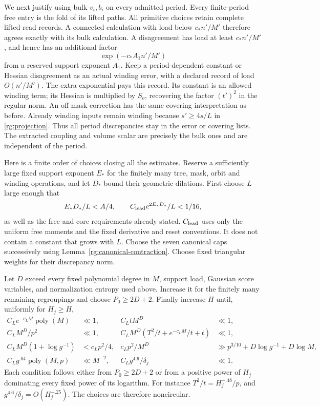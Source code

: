 We next justify using bulk $v_i,b_i$ on every admitted period.
Every finite-period free entry is the fold of its lifted paths.
All primitive choices retain complete lifted read records.
A connected calculation with load below $c_*n'/M'$ therefore
agrees exactly with its bulk calculation.  A disagreement has
load at least $c_*n'/M'$, and hence has an additional factor
\[
                 \exp(-c_*A_1n'/M')
\]
from a reserved support exponent $A_1$.  Keep a period-dependent
constant or Hessian disagreement as an actual winding error,
with a declared record of load $O(n'/M')$.  The extra exponential
pays this record.  Its constant is an allowed winding term; its
Hessian is multiplied by $S_o$, recovering the factor $(t')^2$
in the regular norm.  An off-mask correction has the same
covering interpretation as before.  Already winding inputs
remain winding because $s'\ge4s/L$ in \eqref{rg:projection}.
Thus all period discrepancies stay in the error or covering
lists.  The extracted coupling and volume scalar are precisely
the bulk ones and are independent of the period.

Here is a finite order of choices closing all the estimates.
Reserve a sufficiently large fixed support exponent $E_*$ for
the finitely many tree, mask, orbit and winding operations, and
let $D_*$ bound their geometric dilations.  First choose $L$
large enough that
\[
 E_*D_*/L<A/4,\qquad
 C_{\rm lead}e^{2E_*D_*}/L<1/16,
\]
as well as the free and core requirements already stated.
$C_{\rm lead}$ uses only the uniform free moments and the
fixed derivative and reset conventions.  It does not contain
a constant that grows with $L$.  Choose the seven canonical
caps successively using Lemma~\ref{rg:canonical-contraction}.
Choose fixed triangular weights for their discrepancy norm.

Let $D$ exceed every fixed polynomial degree in $M$, support
load, Gaussian score variables, and normalization entropy
used above.  Increase it for the finitely many remaining
regroupings and choose $P_0\ge2D+2$.  Finally increase $H$ until,
uniformly for $H_j\ge H$,
\begin{align}
 C_Le^{-c_LM}\operatorname{poly}(M)&\ll1,&
 C_LtM^D&\ll1,\nonumber\\
 C_LM^D/p^2&\ll1,&
 C_LM^D(T^2/t+e^{-c_LM}/t+t)&\ll1,\nonumber\\
 C_LM^D(1+\log g^{-1})&<c_Lp^2/4,&
 c_Lp^2/M^D&\gg p^{3/10}+D\log g^{-1}+D\log M,\nonumber\\
 C_Lg^{.04}\operatorname{poly}(M,p)&\ll M^{-2},&
 C_Lg^{4.6}/\delta_j&\ll1 .
 \label{rg:finite-choices}
\end{align}
Each condition follows either from $P_0\ge2D+2$ or from a
positive power of $H_j$ dominating every fixed power of its
logarithm.  For instance $T^2/t=H_j^{-.48}/p$, and
$g^{4.6}/\delta_j=O(H_j^{-.25})$.  The choices are therefore
noncircular.

